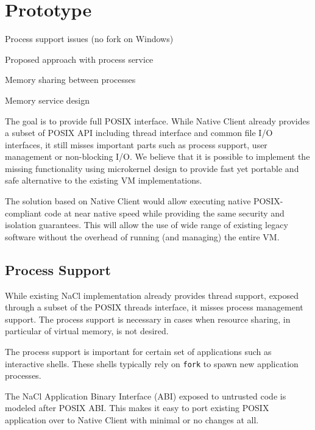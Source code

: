 \section{Prototype}
\label{sec:prototype}

\begin{structure}
\item Process support issues (\eg no fork on Windows)
\item Proposed approach with process service
\item Memory sharing between processes
\item Memory service design
\end{structure}

The goal is to provide full POSIX interface. While Native Client already
provides a subset of POSIX API including thread interface and common
file I/O interfaces, it still misses important parts such as process
support, user management or non-blocking I/O. We believe that it is
possible to implement the missing functionality using microkernel design
to provide fast yet portable and safe alternative to the existing VM
implementations.

The solution based on Native Client would allow executing native
POSIX-compliant code at near native speed while providing the same
security and isolation guarantees. This will allow the use of wide
range of existing legacy software without the overhead of running (and
managing) the entire VM.

\subsection{Process Support}
\label{sub:process_support}

While existing NaCl implementation already provides thread support,
exposed through a subset of the POSIX threads interface, it misses
process management support. The process support is necessary in cases
when resource sharing, in particular of virtual memory, is not desired.

The process support is important for certain set of applications such
as interactive shells. These shells typically rely on \lstinline`fork` to
spawn new application processes. 


The NaCl Application Binary Interface (ABI) exposed to untrusted code is
modeled after POSIX ABI. This makes it easy to port existing POSIX
application over to Native Client with minimal or no changes at all.

